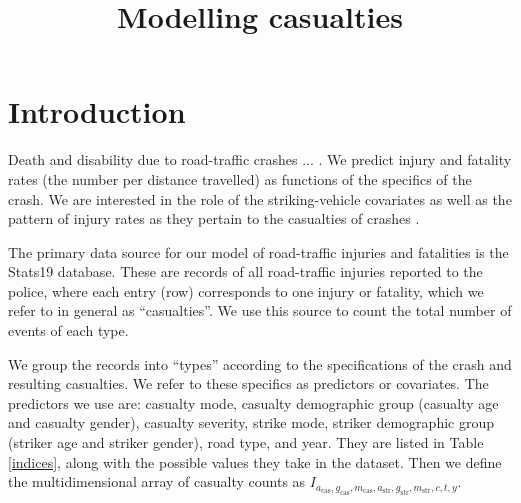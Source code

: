 \documentclass{article}
\title{Modelling casualties}
\begin{document}
\maketitle


\section{Introduction}

Death and disability due to road-traffic crashes ... . We predict injury and fatality rates (the number per distance travelled) as functions of the specifics of the crash. We are interested in the role of the striking-vehicle covariates as well as the pattern of injury rates as they pertain to the casualties of crashes \citep{Feleke2017,Scholes2017a}.

The primary data source for our model of road-traffic injuries and fatalities is the Stats19 database. These are records of all road-traffic injuries reported to the police, where each entry (row) corresponds to one injury or fatality, which we refer to in general as ``casualties''. We use this source to count the total number of events of each type.

We group the records into ``types'' according to the specifications of the crash and resulting casualties. We refer to these specifics as predictors or covariates. The predictors we use are: casualty mode, casualty demographic group (casualty age and casualty gender), casualty severity, strike mode, striker demographic group (striker age and striker gender), road type, and year. %
They are listed in Table \ref{indices}, along with the possible values they take in the dataset. Then we define the multidimensional array of casualty counts as $I_{a_{\text{cas}},g_{\text{cas}},m_{\text{cas}},a_{\text{str}},g_{\text{str}},m_{\text{str}},c,t,y}$.
\end{document}
